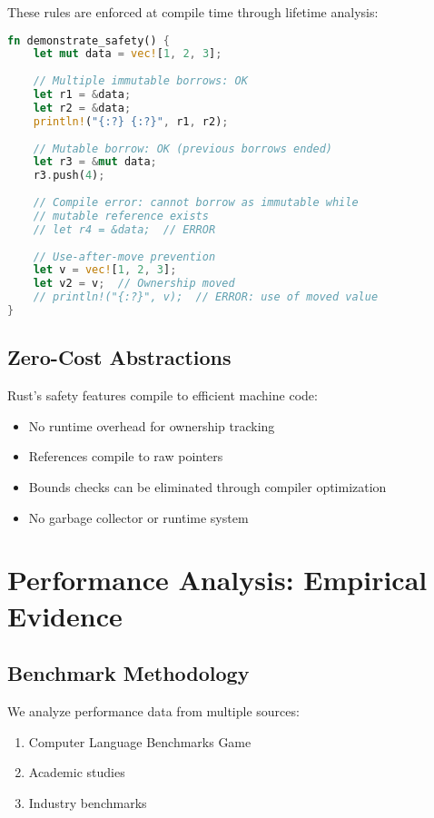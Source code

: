 \documentclass[11pt]{article}
\begin{document}
These rules are enforced at compile time through lifetime analysis:

\begin{lstlisting}[language=Rust,caption={Rust's compile-time safety enforcement},label={lst:rust_borrowing}]
fn demonstrate_safety() {
    let mut data = vec![1, 2, 3];
    
    // Multiple immutable borrows: OK
    let r1 = &data;
    let r2 = &data;
    println!("{:?} {:?}", r1, r2);
    
    // Mutable borrow: OK (previous borrows ended)
    let r3 = &mut data;
    r3.push(4);
    
    // Compile error: cannot borrow as immutable while
    // mutable reference exists
    // let r4 = &data;  // ERROR
    
    // Use-after-move prevention
    let v = vec![1, 2, 3];
    let v2 = v;  // Ownership moved
    // println!("{:?}", v);  // ERROR: use of moved value
}
\end{lstlisting}

\subsection{Zero-Cost Abstractions}

Rust's safety features compile to efficient machine code:
\begin{itemize}
    \item No runtime overhead for ownership tracking
    \item References compile to raw pointers
    \item Bounds checks can be eliminated through compiler optimization
    \item No garbage collector or runtime system
\end{itemize}

\section{Performance Analysis: Empirical Evidence}

\subsection{Benchmark Methodology}

We analyze performance data from multiple sources:
\begin{enumerate}
    \item Computer Language Benchmarks Game~\cite{clbg2023}
    \item Academic studies~\cite{bugden2022study}
    \item Industry benchmarks~\cite{retunsky2023bench,techempower2023}
\end{enumerate}
\end{document}
